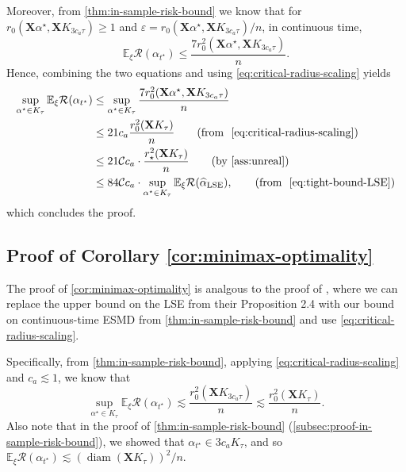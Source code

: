 \documentclass[a4paper]{article}
\newcommand{\X}[0]{\mathbf{X}}
\newcommand{\EE}[0]{\mathbb{E}}
\newcommand{\cC}[0]{\mathcal{C}}
\newcommand{\cR}[0]{\mathcal{R}}
\newcommand{\eps}[0]{\varepsilon}
\newcommand{\ha}[0]{\widehat{\alpha}}
\newcommand{\alphastar}{\alpha^\star}
\newcommand{\alphatstar}[0]{\alpha_{t^\star}}
\DeclareMathOperator{\LSEOp}{LSE}
\newcommand{\haLSE}[0]{\ha_{{\LSEOp}}}
\newcommand{\Kt}[0]{K_\tau}
\DeclareMathOperator{\diamOp}{diam}
\newcommand{\diam}[0]{{\diamOp}}
\newcommand{\rstar}[0]{r_\star}
\newcommand{\rzero}[0]{r_{0}}
\theoremstyle{thmstyle}
\theoremstyle{defstyle}
\theoremstyle{remark}
\begin{document}
Moreover, from \cref{thm:in-sample-risk-bound} we know that for $\rzero(\X\alphastar,\X K_{3c_a\tau})\geq 1$ and $\eps=\rzero(\X\alphastar,\X K_{3c_a\tau})/n$, in continuous time,
\begin{equation*}
    \EE_\xi \cR(\alphatstar) \leq \frac{7\rzero^2(\X\alphastar,\X K_{3c_a\tau})}{n}.
\end{equation*}
Hence, combining the two equations and using \cref{eq:critical-radius-scaling} yields
\begin{align}
    \sup_{\alphastar\in \Kt}\EE_\xi \cR(\alphatstar)&\leq \sup_{\alphastar\in \Kt} \frac{7\rzero^2(\X\alphastar, \X K_{3c_a\tau})}{n} \nonumber \\
    &\leq 21c_a \frac{ \rzero^2( \X K_{\tau})}{n} \tag{\text{from } \eqref{eq:critical-radius-scaling}} \\
    &\leq 21\cC c_a \cdot \frac{\rstar^2(\X K_{\tau})}{n} \tag{\text{by \cref{ass:unreal}}} \\
    &\leq 84 \cC c_a \cdot \sup_{\alphastar\in \Kt} \EE_\xi \cR (\haLSE), \tag{\text{from } \eqref{eq:tight-bound-LSE}}
\end{align}
which concludes the proof.



\subsection{Proof of Corollary \ref{cor:minimax-optimality}}
\label{subsec:proof-minimax-optimality}

The proof of \cref{cor:minimax-optimality} is analgous to the proof of \citet[Corollary 2.6]{Prasadan2024some}, where we can replace the upper bound on the LSE from their Proposition 2.4 with our bound on continuous-time ESMD from \cref{thm:in-sample-risk-bound} and use \cref{eq:critical-radius-scaling}.

Specifically, from \cref{thm:in-sample-risk-bound}, applying \cref{eq:critical-radius-scaling} and $c_a\lesssim 1$, we know that
\begin{equation*}
    \sup_{\alphastar\in \Kt}\EE_\xi \cR(\alphatstar)\lesssim  \frac{\rzero^2(\X K_{3c_a\tau})}{n} \lesssim \frac{\rzero^2(\X \Kt)}{n}.
\end{equation*}
Also note that in the proof of \cref{thm:in-sample-risk-bound} (\cref{subsec:proof-in-sample-risk-bound}), we showed that $\alphatstar\in 3c_a\Kt$, and so $\EE_\xi \cR(\alphatstar)\lesssim (\diam(\X \Kt))^2/n$.
\end{document}
